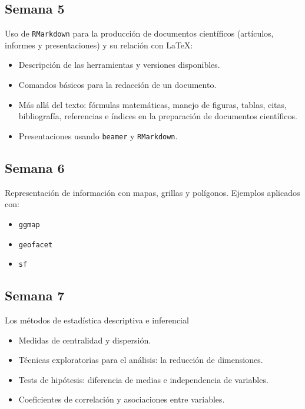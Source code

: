\documentclass[11pt]{article}
\begin{document}
\subsection*{Semana 5}

Uso de \verb=RMarkdown= para la producción de documentos científicos (artículos, informes y presentaciones) y su relación con \LaTeX: 

    \begin{itemize}
        \item Descripción de las herramientas y versiones disponibles.
        \item Comandos básicos para la redacción de un documento.
        \item Más allá del texto: fórmulas matemáticas, manejo de figuras, tablas, citas, bibliografía, referencias e índices en la preparación de documentos científicos.
        \item Presentaciones usando \verb=beamer= y \verb=RMarkdown=.
    \end{itemize}
    
\subsection*{Semana 6}
Representación de información con mapas, grillas y polígonos. Ejemplos aplicados con:
        \begin{itemize}
            \item \verb=ggmap=
            \item \verb=geofacet= 
            \item \verb=sf=
        \end{itemize}

\subsection*{Semana 7}

Los métodos de estadística descriptiva e inferencial    
    \begin{itemize}
        \item Medidas de centralidad y dispersión.
        \item Técnicas exploratorias para el análisis: la reducción de dimensiones.
        \item Tests de hipótesis: diferencia de medias e independencia de variables.
        \item Coeficientes de correlación y asociaciones entre variables.
    \end{itemize}   
\end{document}
